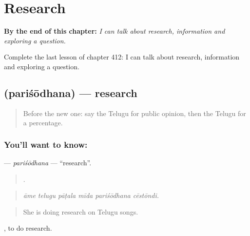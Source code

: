 
\chapter{Research}
\label{ch:te-research}

\begin{chapteropening}
\textbf{By the end of this chapter:} \emph{I can talk about research, information and exploring a question.}

Complete the last lesson of chapter 412: I can talk about research, information and exploring a question.
\end{chapteropening}

\section[\texorpdfstring{\te{పరిశోధన} (pariśōdhana)}{పరిశోధన (pariśōdhana)}]{ (pariśōdhana) — research}

\label{lesson:TE-C412-parisodhana}



\begin{quote}
Before the new one: say the Telugu for public opinion, then the Telugu for a percentage.
\end{quote}

\subsection*{You'll want to know: }
\textbf{} — \emph{pariśōdhana} — \textquotedblleft{}research\textquotedblright{}.

\begin{quote}
     .
\end{quote}

\begin{quote}
\emph{āme telugu pāṭala mīda pariśōdhana cēstōndi.}
\end{quote}

\begin{quote}
She is doing research on Telugu songs.
\end{quote}

 , to do research.

